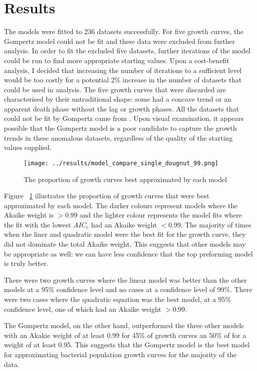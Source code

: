 \documentclass[11pt]{article}
\begin{document}
 
  \section{Results}

  The models were fitted to 236 datasets successfully. For five growth curves, the Gompertz model could not be fit and these data were excluded from further analysis. In order to fit the excluded five datasets, further iterations of the model could be run to find more appropriate starting values. Upon a cost-benefit analysis, I decided that increasing the number of iterations to a sufficient level would be too costly for a potential 2\% increase in the number of  datasets that could be used in analysis. The five growth curves that were discarded are characterised by their untraditional shape: some had a concave trend or an apparent death phase without the lag or growth phases. All the datasets that could not be fit by Gompertz came from \citep{Bae2014}. Upon visual examination, it appears possible that the Gompertz model is a poor candidate to capture the growth trends in these anomalous datasets, regardless of the quality of the starting values supplied. 

  \begin{figure}[!ht]
    \centering
    \texttt{[image: ../results/model\_compare\_single\_dougnut\_99.png]}
    \caption{The proportion of growth curves best approximated by each model}
    \label{doughnut}
   \end{figure}

  Figure ~\ref{doughnut} illustrates the proportion of growth curves that were best approximated by each model. The darker colours represent models where the Akaike weight is $>$0.99 and the lighter colour represents the model fits where the fit with the lowest $AIC_{c}$ had an Akaike weight $<$0.99. 
  The majority of times when the liner and quadratic model were the best fit for the growth curve, they did not dominate the total Akaike weight. This suggests that other models may be appropriate as well: we can have less confidence that the top preforming model is truly better. 

  There were two growth curves where the linear model was better than the other models at a 95\% confidence level and no cases at a confidence level of 99\%. There were two cases where the quadratic equation was the best model, at a 95\% confidence level, one of which had an Akaike weight $>$0.99.
  
  The Gompertz model, on the other hand, outperformed the three other models with an Akakie weight of at least 0.99 for 45\% of growth curves an 50\% of for a weight of at least 0.95. This suggests that the Gompertz model is the best model for approximating bacterial population growth curves for the majority of the data. 
  
\end{document}
